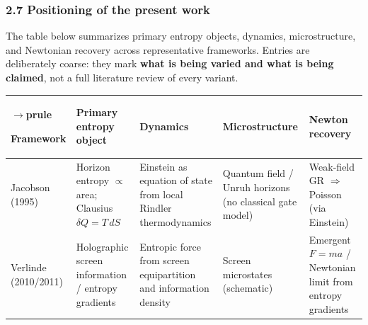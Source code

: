 \documentclass[
  11pt,
]{article}
\newcounter{none} %
\begin{document}
\subsubsection{2.7 Positioning of the present work}\label{positioning-of-the-present-work}

The table below summarizes primary entropy objects, dynamics, microstructure, and Newtonian recovery across representative frameworks. Entries are deliberately coarse: they mark \textbf{what is being varied and what is being claimed}, not a full literature review of every variant.

{\def\LTcaptype{none} %
\begin{longtable}[]{@{}
  >{\raggedright\arraybackslash}p{}
  >{\raggedright\arraybackslash}p{}
  >{\raggedright\arraybackslash}p{}
  >{\raggedright\arraybackslash}p{}
  >{\raggedright\arraybackslash}p{}@{}}
$\rightarrow$prule\noalign{}
\begin{minipage}[b]{\linewidth}\raggedright
Framework
\end{minipage} & \begin{minipage}[b]{\linewidth}\raggedright
Primary entropy object
\end{minipage} & \begin{minipage}[b]{\linewidth}\raggedright
Dynamics
\end{minipage} & \begin{minipage}[b]{\linewidth}\raggedright
Microstructure
\end{minipage} & \begin{minipage}[b]{\linewidth}\raggedright
Newton recovery
\end{minipage} \\
\midrule\noalign{}
\endhead
\bottomrule\noalign{}
\endlastfoot
Jacobson (1995) & Horizon entropy \(\propto\) area; Clausius \(\delta Q=T\,dS\) & Einstein as equation of state from local Rindler thermodynamics & Quantum field / Unruh horizons (no classical gate model) & Weak-field GR \(\Rightarrow\) Poisson (via Einstein) \\
Verlinde (2010/2011) & Holographic screen information / entropy gradients & Entropic force from screen equipartition and information density & Screen microstates (schematic) & Emergent \(F=ma\) / Newtonian limit from entropy gradients \\

\end{longtable}}
\end{document}
